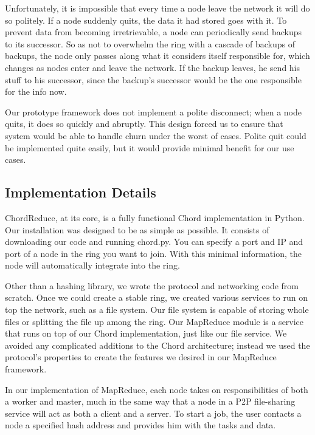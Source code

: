 \documentclass[conference, compsocconf, letterpaper]{IEEEtran}
\begin{document}
Unfortunately, it is impossible that every time a node leave the network it will do so politely.  If a node suddenly quits, the data it had stored goes with it. To prevent data from becoming irretrievable, a node can periodically send backups to its successor.  So as not to overwhelm the ring with a cascade of backups of backups, the node only passes along what it considers itself responsible for, which changes as nodes enter and leave the network.  If the backup leaves, he send his stuff to his successor, since the backup's successor would be the one responsible for the info now. 

Our prototype framework does not implement a polite disconnect;  when a node quits, it does so quickly and abruptly.  This design forced us to ensure that system would be able to handle churn under the worst of cases.  Polite quit could be implemented quite easily, but it would provide minimal benefit for our use cases. 


\subsection{Implementation Details}

ChordReduce, at its core, is a fully functional Chord implementation in Python.  Our installation was designed to be as simple as possible.   It consists of downloading our code \cite{code} and running chord.py.  You can specify a port and IP and port of a node in the ring you want to join.  With this minimal information, the node will automatically integrate into the ring.

Other than a hashing library, we wrote the protocol and networking code from scratch.  Once we could create a stable ring, we created various services to run on top the network, such as a file system.  Our file system is capable of storing whole files or splitting the file up among the ring. Our MapReduce module is a service that runs on top of our Chord implementation, just like our file service.    We avoided any complicated additions to the Chord architecture; instead we used the protocol's properties to create the features we desired in our MapReduce framework. 
  
In our implementation of MapReduce, each node takes on responsibilities of both a worker and master, much in the same way that a node in a P2P file-sharing service will act as both a client and a server.  To start a job, the user contacts a node a specified hash address and provides him with the tasks and data. 
\end{document}
